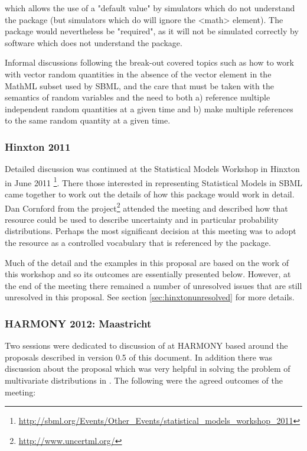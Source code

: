 \documentclass[draftspec]{sbmlpkgspec}
\begin{document}
which allows the use of a "default value" by simulators which do not
understand the package (but simulators which do will ignore the <math>
element). The package would nevertheless be "required", as it will not
be simulated correctly by software which does not understand the
package.

Informal discussions following the break-out covered topics such as
how to work with vector random quantities in the absence of the vector
element in the MathML subset used by SBML, and the care that must be
taken with the semantics of random variables and the need to both a)
reference multiple independent random quantities at a given time and
b) make multiple references to the same random quantity at a given
time.

\subsubsection{Hinxton 2011}

Detailed discussion was continued at the Statistical Models Workshop
in Hinxton in June 2011%
\footnote{\url{http://sbml.org/Events/Other_Events/statistical_models_workshop_2011}}. There
those interested in representing Statistical Models in SBML came
together to work out the details of how this package would work in
detail. Dan Cornford from the \uncertml
project\footnote{\url{http://www.uncertml.org/}} attended the meeting
and described how that resource could be used to describe uncertainty
and in particular probability distributions. Perhaps the most
significant decision at this meeting was to adopt the \uncertml
resource as a controlled vocabulary that is referenced by the \distrib package.

Much of the detail and the examples in this proposal are based on
the work of this workshop and so its outcomes are essentially
presented below. However, at the end of the meeting there remained a
number of unresolved issues that are still unresolved in this
proposal. See section \vref{sec:hinxtonunresolved} for more details.


\subsubsection{HARMONY 2012: Maastricht}

Two sessions were dedicated to discussion of \distrib at HARMONY based
around the proposals described in version 0.5 of this document. In
addition there was discussion about the \arrays proposal which was
very helpful in solving the problem of multivariate distributions in
\distrib. The following were the agreed outcomes of the meeting:
\end{document}
